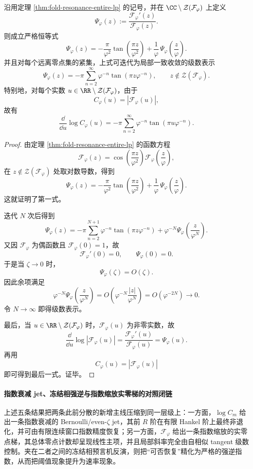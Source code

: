\begin{theorem}\label{thm:xi-fold-resonance-logderivative-selfsimilar}
沿用定理 \ref{thm:fold-resonance-entire-lp} 的记号，并在
\(\CC\setminus\mathcal Z(\mathcal F_\varphi)\) 上定义
\[
\Psi_\varphi(z):=\frac{\mathcal F_\varphi'(z)}{\mathcal F_\varphi(z)}.
\]
则成立严格恒等式
\[
\boxed{\;
\Psi_\varphi(z)=
-\frac{\pi}{\varphi^2}\tan\!\left(\frac{\pi z}{\varphi^2}\right)
+\frac{1}{\varphi}\,\Psi_\varphi\!\left(\frac{z}{\varphi}\right).
\;}
\]
并且对每个远离零点集的紧集，上式可迭代为局部一致收敛的级数表示
\[
\boxed{\;
\Psi_\varphi(z)=
-\pi\sum_{n=2}^{\infty}\varphi^{-n}\tan(\pi z\varphi^{-n}),
\qquad
z\notin \mathcal Z(\mathcal F_\varphi).
\;}
\]
特别地，对每个实数 \(u\in\RR\setminus\mathcal Z(\mathcal F_\varphi)\)，由于
\[
C_\varphi(u)=|\mathcal F_\varphi(u)|,
\]
故有
\[
\boxed{\;
\frac{\dd}{\dd u}\log C_\varphi(u)
=
-\pi\sum_{n=2}^{\infty}\varphi^{-n}\tan(\pi u\varphi^{-n}).
\;}
\]
\end{theorem}
\begin{proof}
由定理 \ref{thm:fold-resonance-entire-lp} 的函数方程
\[
\mathcal F_\varphi(z)=
\cos\!\left(\frac{\pi z}{\varphi^2}\right)
\mathcal F_\varphi\!\left(\frac{z}{\varphi}\right),
\]
在 \(z\notin \mathcal Z(\mathcal F_\varphi)\) 处取对数导数，得到
\[
\Psi_\varphi(z)=
-\frac{\pi}{\varphi^2}\tan\!\left(\frac{\pi z}{\varphi^2}\right)
+\frac{1}{\varphi}\,\Psi_\varphi\!\left(\frac{z}{\varphi}\right).
\]
这就证明了第一式。

迭代 \(N\) 次后得到
\[
\Psi_\varphi(z)=
-\pi\sum_{n=2}^{N+1}\varphi^{-n}\tan(\pi z\varphi^{-n})
+\varphi^{-N}\Psi_\varphi\!\left(\frac{z}{\varphi^{N}}\right).
\]
又因 \(\mathcal F_\varphi\) 为偶函数且 \(\mathcal F_\varphi(0)=1\)，故
\[
\mathcal F_\varphi'(0)=0,
\qquad
\Psi_\varphi(0)=0.
\]
于是当 \(\zeta\to 0\) 时，
\[
\Psi_\varphi(\zeta)=O(\zeta).
\]
因此余项满足
\[
\varphi^{-N}\Psi_\varphi\!\left(\frac{z}{\varphi^{N}}\right)
=
O\!\left(\varphi^{-N}\frac{|z|}{\varphi^{N}}\right)
=
O(\varphi^{-2N})\to 0.
\]
令 \(N\to\infty\) 即得级数表示。

最后，当 \(u\in\RR\setminus \mathcal Z(\mathcal F_\varphi)\) 时，\(\mathcal F_\varphi(u)\) 为非零实数，故
\[
\frac{\dd}{\dd u}\log|\mathcal F_\varphi(u)|
=
\frac{\mathcal F_\varphi'(u)}{\mathcal F_\varphi(u)}
=
\Psi_\varphi(u).
\]
再用
\[
C_\varphi(u)=|\mathcal F_\varphi(u)|
\]
即可得到最后一式。证毕。
\end{proof}

\paragraph{指数衰减 jet、冻结相强逆与指数缩放实零梯的对照闭链}
上述五条结果把两条此前分散的新增主线压缩到同一层级上：一方面，\(\log C_m\) 给出一条指数衰减的 Bernoulli/even-\(\zeta\) jet，其前 \(R\) 阶在有限 Hankel 阶上最终非退化，并可由有限连续窗口指数精度恢复；另一方面，\(\mathcal F_\varphi\) 给出一条指数缩放的实零点梯，其总体零点计数却呈现线性主项，并且局部斜率完全由自相似 tangent 级数控制。夹在二者之间的冻结相预言机反演，则把“可否恢复”精化为严格的强逆指数，从而把阈值现象提升为速率现象。

\endinput
